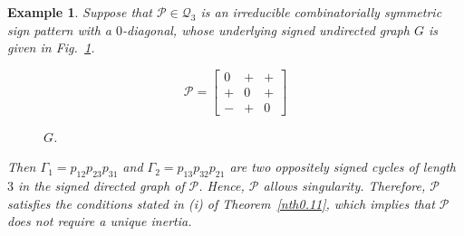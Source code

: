 \documentclass[10pt,a4paper]{amsart}
\newtheorem{eg}{Example}[section]
\numberwithin{equation}{section}
\begin{document}
\begin{eg}\label{xxeg1}
	Suppose that $\mathcal{P}\in \mathcal{Q}_3$ is an irreducible combinatorially symmetric sign pattern with a $0$-diagonal, whose underlying signed undirected graph $G$ is given in Fig.~\ref{xx1}.
	\begin{figure}[H]
		\centering
		\begin{minipage}{.45\textwidth}
			\vspace{-1cm}
			\[
			\mathcal{P}=
			\begin{bmatrix}
				0 & + & + \\
				+ & 0 & + \\
				- & + & 0
			\end{bmatrix}
			\]
		\end{minipage}
		\hspace{0.05\textwidth}
		\begin{minipage}{.45\textwidth}
			\centering
			\tikzset{node distance=1cm}
			\caption{ $G$.}
			\label{xx1}
		\end{minipage}
	\end{figure}
	
	Then $\Gamma_1 = p_{12}p_{23}p_{31}$ and $\Gamma_2 = p_{13}p_{32}p_{21}$ are two oppositely signed cycles of length $3$ in the signed directed graph of $\mathcal{P}$. Hence, $\mathcal{P}$ allows singularity. Therefore, $\mathcal{P}$ satisfies the conditions stated in (i) of Theorem~\ref{nth0.11}, which implies that $\mathcal{P}$  does not require a unique inertia.
\end{eg}
\end{document}
